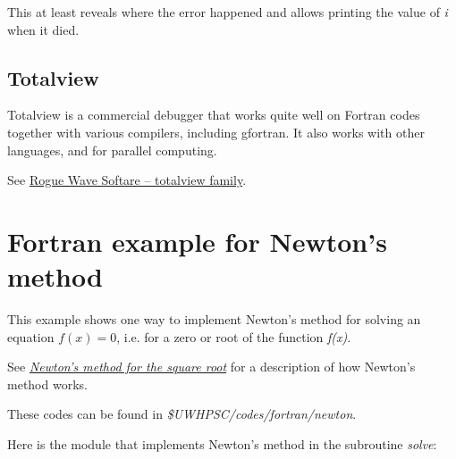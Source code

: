 \documentclass[letterpaper,10pt,english]{sphinxmanual}
\begin{document}
This at least reveals where the error happened and allows printing the value
of \emph{i} when it died.


\subsection{Totalview}
\label{fortran_debugging:totalview}
Totalview is a commercial debugger that works quite well on Fortran codes
together with various compilers, including gfortran.  It also works with
other languages, and for parallel computing.

See \href{http://www.roguewave.com/products/totalview-family.aspx}{Rogue Wave Softare -- totalview family}.


\section{Fortran example for Newton's method}
\label{fortran_newton:fortran-newton}\label{fortran_newton:fortran-example-for-newton-s-method}\label{fortran_newton::doc}
This example shows one way to implement Newton's method for solving an
equation $f(x)=0$, i.e. for a zero or root of the function \emph{f(x)}.

See {\hyperref[special_functions:special-newton]{\emph{Newton's method for the square root}}} for a description of how Newton's method works.

These codes can be found in \emph{\$UWHPSC/codes/fortran/newton}.

Here is the module that implements Newton's method in the subroutine
\emph{solve}:
\end{document}
